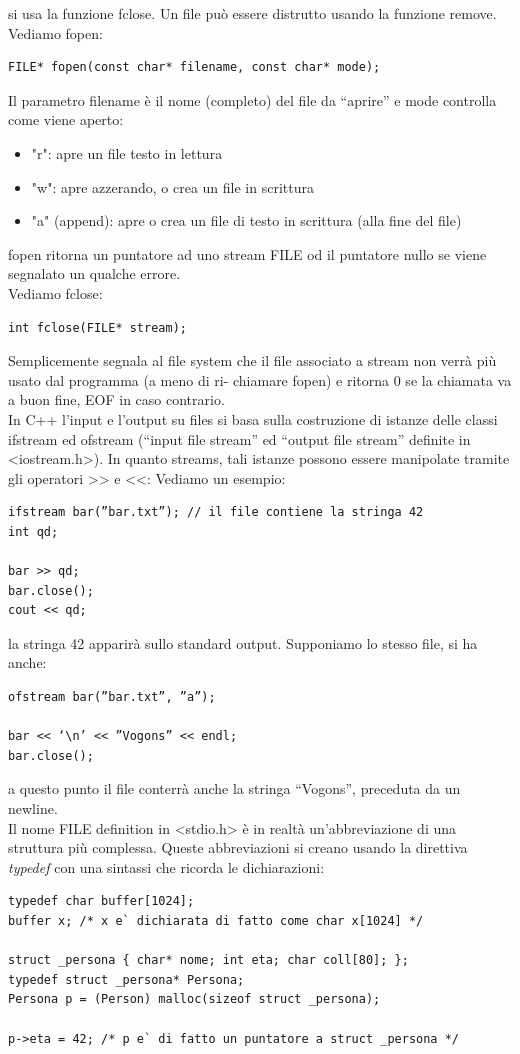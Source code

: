\documentclass[a4paper,12pt, oneside]{book}
\begin{document}
si usa la funzione fclose. Un file può essere distrutto usando la funzione remove. \\
Vediamo fopen:
\begin{verbatim}
FILE* fopen(const char* filename, const char* mode);
\end{verbatim}
Il parametro filename è il nome (completo) del file da “aprire” e mode controlla come viene aperto:
\begin{itemize}
\item "r": apre un file testo in lettura
\item "w": apre azzerando, o crea un file in scrittura
\item "a" (append): apre o crea un file di testo in scrittura (alla fine del file)
\end{itemize}
fopen ritorna un puntatore ad uno stream FILE od il puntatore
nullo se viene segnalato un qualche errore.
\\
Vediamo fclose:
\begin{verbatim}
int fclose(FILE* stream);
\end{verbatim}
Semplicemente segnala al file system che il file associato a
stream non verrà più usato dal programma (a meno di ri-
chiamare fopen) e ritorna 0 se la chiamata va a buon fine, EOF in caso contrario.\\
In C++ l’input e l’output su files si basa sulla costruzione di istanze delle classi ifstream ed ofstream (“input file stream” ed “output file stream” definite in <iostream.h>). In quanto streams, tali istanze possono essere manipolate
tramite gli operatori >> e <<: Vediamo un esempio:
\begin{verbatim}
ifstream bar(”bar.txt”); // il file contiene la stringa 42
int qd;

bar >> qd;
bar.close();
cout << qd;
\end{verbatim}
la stringa 42 apparirà sullo standard output. Supponiamo lo stesso file, si ha anche:
\begin{verbatim}
ofstream bar(”bar.txt”, ”a”);

bar << ‘\n’ << ”Vogons” << endl;
bar.close();
\end{verbatim}
a questo punto il file conterrà anche la stringa “Vogons”,
preceduta da un newline.\\
Il nome FILE definition in <stdio.h> è in realtà un’abbreviazione di una struttura più complessa.  Queste abbreviazioni si creano usando la direttiva \textit{typedef }con una
sintassi che ricorda le dichiarazioni:
\begin{verbatim}
typedef char buffer[1024];
buffer x; /* x e` dichiarata di fatto come char x[1024] */ 

struct _persona { char* nome; int eta; char coll[80]; };
typedef struct _persona* Persona;
Persona p = (Person) malloc(sizeof struct _persona); 

p->eta = 42; /* p e` di fatto un puntatore a struct _persona */
\end{verbatim}
\end{document}
